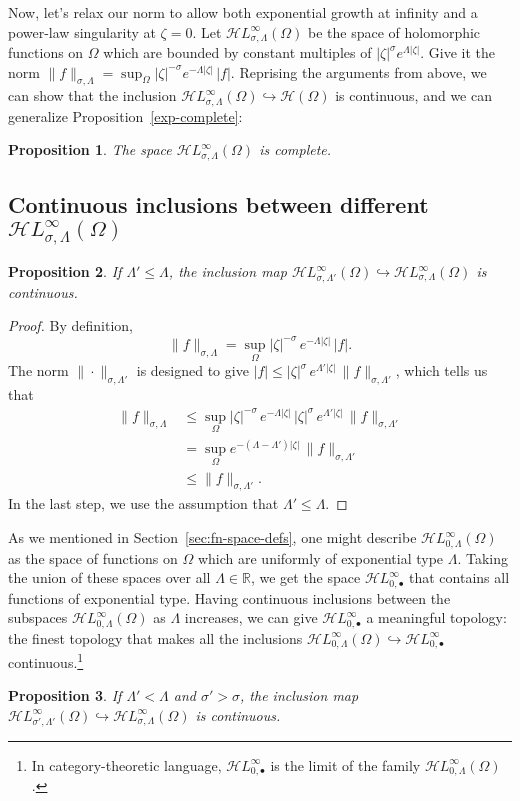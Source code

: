 \documentclass{article}
\theoremstyle{plain}
\newtheorem{prop}{Proposition}
\newcommand{\R}{\mathbb{R}}
\newcommand{\holo}{\mathcal{H}}
\newcommand{\singexp}[2]{\mathcal{H}L^\infty_{#1, #2}}
\newcommand{\singexpalg}[1]{\singexp{#1}{\bullet}}
\newcommand{\domain}{\Omega}
\begin{document}
Now, let's relax our norm to allow both exponential growth at infinity and a power-law singularity at $\zeta = 0$. Let $\singexp{\sigma}{\Lambda}(\Omega)$ be the space of holomorphic functions on $\Omega$ which are bounded by constant multiples of $|\zeta|^\sigma e^{\Lambda|\zeta|}$. Give it the norm $\|f\|_{\sigma,\Lambda} = \sup_\Omega |\zeta|^{-\sigma} e^{-\Lambda|\zeta|}\,|f|$. Reprising the arguments from above, we can show that the inclusion $\singexp{\sigma}{\Lambda}(\Omega) \hookrightarrow \holo(\Omega)$ is continuous, and we can generalize Proposition~\ref{exp-complete}:
\begin{prop}
The space $\singexp{\sigma}{\Lambda}(\Omega)$ is complete.
\end{prop}

\subsection{Continuous inclusions between different $\singexp{\sigma}{\Lambda}(\Omega)$}\label{sec:inclusions}
\begin{prop}
If $\Lambda'\leq\Lambda$, the inclusion map $\singexp{\sigma}{\Lambda'}(\Omega)\hookrightarrow \singexp{\sigma}{\Lambda}(\Omega)$ is continuous.
\end{prop}
\begin{proof}
By definition,
\[ \|f\|_{\sigma,\Lambda}=\sup_{\Omega} |\zeta|^{-\sigma}\,e^{-\Lambda |\zeta|}\, |f|. \]
The norm $\|\cdot\|_{\sigma, \Lambda'}$ is designed to give $|f| \le |\zeta|^\sigma\,e^{\Lambda'|\zeta|}\,\|f\|_{\sigma, \Lambda'}$, which tells us that
\begin{align*}
\|f\|_{\sigma,\Lambda} & \leq \sup_{\Omega} |\zeta|^{-\sigma}\,e^{-\Lambda |\zeta|}\,|\zeta|^\sigma\,e^{\Lambda'|\zeta|}\,\|f\|_{\sigma, \Lambda'}\\
&=\sup_{\Omega} e^{-(\Lambda-\Lambda') |\zeta|}\,\|f\|_{\sigma, \Lambda'}\\
&\leq \|f\|_{\sigma,\Lambda'}.
\end{align*}
In the last step, we use the assumption that $\Lambda' \le \Lambda$.
\end{proof}
As we mentioned in Section~\ref{sec:fn-space-defs}, one might describe $\singexp{0}{\Lambda}(\domain)$ as the space of functions on $\domain$ which are uniformly of exponential type $\Lambda$. Taking the union of these spaces over all $\Lambda \in \R$, we get the space $\singexpalg{0}$ that contains all functions of exponential type. Having continuous inclusions between the subspaces $\singexp{0}{\Lambda}(\domain)$ as $\Lambda$ increases, we can give $\singexpalg{0}$ a meaningful topology: the finest topology that makes all the inclusions $\singexp{0}{\Lambda}(\domain) \hookrightarrow \singexpalg{0}$ continuous.\footnote{In category-theoretic language, $\singexpalg{0}$ is the limit of the family $\singexp{0}{\Lambda}(\domain)$.}
\begin{prop}
    If $\Lambda'<\Lambda$ and $\sigma'>\sigma$, the inclusion map $\singexp{\sigma'}{\Lambda'}(\Omega)\hookrightarrow \singexp{\sigma}{\Lambda}(\Omega)$ is continuous.
\end{prop}
\end{document}
